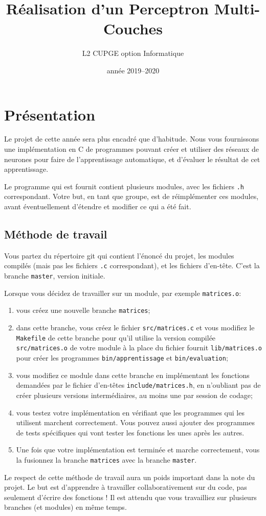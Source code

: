 \documentclass[a4paper]{article}
\title{Réalisation d'un Perceptron Multi-Couches}
\date{année 2019--2020}
\author{L2 CUPGE option Informatique}
\begin{document}
\maketitle

\section{Présentation}

Le projet de cette année sera plus \og encadré\fg{} que d'habitude.
Nous vous fournissons une implémentation en C de programmes pouvant
créer et utiliser des réseaux de neurones pour faire de
l'apprentissage automatique, et d'évaluer le résultat de cet apprentissage.

Le programme qui est fournit contient plusieurs modules, avec les
fichiers \texttt{.h} correspondant. Votre but, en tant que groupe, est
de réimplémenter ces modules, avant éventuellement d'étendre et
modifier ce qui a été fait.


\subsection{Méthode de travail}

Vous partez du répertoire git qui contient l'énoncé du projet, les
modules compilés (mais pas les fichiers \texttt{.c} correspondant), et
les fichiers d'en-tête. C'est la branche \texttt{master}, version
initiale.

Lorsque vous décidez de travailler sur un module, par exemple
\texttt{matrices.o}:
\begin{enumerate}
\item vous créez une nouvelle branche \texttt{matrices};
\item dans cette branche, vous créez le fichier
  \texttt{src/matrices.c} et vous modifiez le \texttt{Makefile} de
  cette branche pour qu'il utilise la version compilée
  \texttt{src/matrices.o} de votre module à la place du fichier
  fournit \texttt{lib/matrices.o} pour créer les programmes
  \texttt{bin/apprentissage} et \texttt{bin/evaluation};
\item vous modifiez ce module dans cette branche en implémentant les
  fonctions demandées par le fichier d'en-têtes
  \texttt{include/matrices.h}, en n'oubliant pas de créer plusieurs
  versions intermédiaires, au moins une par session de codage;
\item vous testez votre implémentation en vérifiant que les programmes
  qui les utilisent marchent correctement. Vous pouvez aussi ajouter
  des programmes de tests spécifiques qui vont tester les fonctions
  les unes après les autres.
\item Une fois que votre implémentation est terminée et marche
  correctement, vous la fusionnez la branche \texttt{matrices} avec la
  branche \texttt{master}.
\end{enumerate}
Le respect de cette méthode de travail aura un poids important dans la
note du projet. Le but est d'apprendre à travailler collaborativement
sur du code, pas seulement d'écrire des fonctions ! Il est attendu que
vous travailliez sur plusieurs branches (et modules) en même temps.
\end{document}
